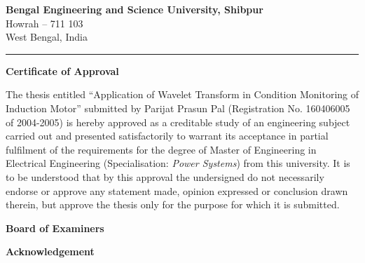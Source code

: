 \documentclass[a4paper,11pt]{report}
\begin{document}
\thispagestyle{empty}
\vspace*{7mm}
\begin{center}
{\Large \textbf{Bengal Engineering and Science University, Shibpur}}\\
\vspace{3.5pt}
{\large Howrah -- 711 103}\\
\vspace{3.5pt}
{\large West Bengal, India}
\end{center}
\hrule

\vspace{25mm}
\begin{center}
{\Large \textbf{Certificate of Approval}}
\end{center}

\noindent The thesis entitled ``Application of Wavelet Transform in Condition Monitoring of Induction Motor'' submitted by Parijat Prasun Pal (Registration No. 160406005 of 2004-2005) is hereby approved as a creditable study of an engineering subject carried out and presented satisfactorily to warrant its acceptance in partial fulfilment of the requirements for the degree of Master of Engineering in Electrical Engineering (Specialisation: \emph{Power Systems}) from this university. It is to be understood that by this approval the undersigned do not necessarily endorse or approve any statement made, opinion expressed or conclusion drawn therein, but approve the thesis only for the purpose for which it is submitted.

\vspace{25mm}
\hspace*{90mm} \textbf{Board of Examiners}

\vspace{40pt}
\hspace*{90mm} \dotfill
\vspace{20pt}
\hspace*{90mm} \dotfill
\vspace{20pt}
\hspace*{90mm} \dotfill

\clearpage
 
\thispagestyle{empty}
\vspace*{65mm}
\begin{center}
{\Large \textbf{Acknowledgement}}
\end{center}
\end{document}
